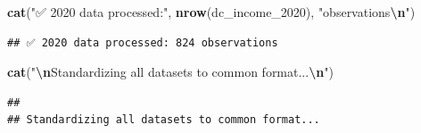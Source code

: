 \documentclass[
]{article}
\newenvironment{Shaded}{\begin{snugshade}}{\end{snugshade}}
\newcommand{\FunctionTok}[1]{\textcolor[rgb]{0.13,0.29,0.53}{\textbf{#1}}}
\newcommand{\NormalTok}[1]{#1}
\newcommand{\SpecialCharTok}[1]{\textcolor[rgb]{0.81,0.36,0.00}{\textbf{#1}}}
\newcommand{\StringTok}[1]{\textcolor[rgb]{0.31,0.60,0.02}{#1}}
\begin{document}
\begin{Shaded}
\begin{Highlighting}[]
\FunctionTok{cat}\NormalTok{(}\StringTok{"✅ 2020 data processed:"}\NormalTok{, }\FunctionTok{nrow}\NormalTok{(dc\_income\_2020), }\StringTok{"observations}\SpecialCharTok{\textbackslash{}n}\StringTok{"}\NormalTok{)}
\end{Highlighting}
\end{Shaded}

\begin{verbatim}
## ✅ 2020 data processed: 824 observations
\end{verbatim}

\begin{Shaded}
\begin{Highlighting}[]
\FunctionTok{cat}\NormalTok{(}\StringTok{"}\SpecialCharTok{\textbackslash{}n}\StringTok{Standardizing all datasets to common format...}\SpecialCharTok{\textbackslash{}n}\StringTok{"}\NormalTok{)}
\end{Highlighting}
\end{Shaded}

\begin{verbatim}
## 
## Standardizing all datasets to common format...
\end{verbatim}
\end{document}
